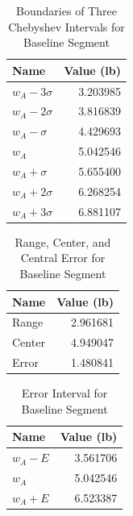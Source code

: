 \begin{table}[ht]
    \centering
    \begin{tabular}{|l|r|}
        \hline
        \textbf{Name} & \textbf{Value (lb)} \\
        \hline
        $w_{A} - 3 \sigma$ & 3.203985 \\
        $w_{A} - 2 \sigma$ & 3.816839 \\
        $w_{A} - \sigma$ & 4.429693 \\
        \hline
        $w_{A}$ & 5.042546 \\
        \hline
        $w_{A} + \sigma$ & 5.655400 \\
        $w_{A} + 2 \sigma$ & 6.268254 \\
        $w_{A} + 3 \sigma$ & 6.881107 \\
        \hline
    \end{tabular}
    \caption{Boundaries of Three Chebyshev Intervals for Baseline Segment}
    \label{table:00.baseline.chebyshev}
\end{table}
\begin{table}[ht]
    \centering
	\begin{tabular}{|l|r|} \hline
		\textbf{Name} & \textbf{Value (lb)} \\
		\hline
		Range & 2.961681 \\
	    Center & 4.949047 \\
		Error & 1.480841 \\
		\hline
	\end{tabular}
    \caption{Range, Center, and Central Error for Baseline Segment}
    \label{table:00.baseline.range}
\end{table}
\begin{table}[ht]
    \centering
	\begin{tabular}{|l|r|} \hline
		\textbf{Name} & \textbf{Value (lb)} \\
		\hline
		$w_{A} - E$ & 3.561706 \\
		$w_{A}$ & 5.042546 \\
		$w_{A} + E$ & 6.523387 \\
		\hline
	\end{tabular}
    \caption{Error Interval for Baseline Segment}
    \label{table:00.baseline.interval}
\end{table}
